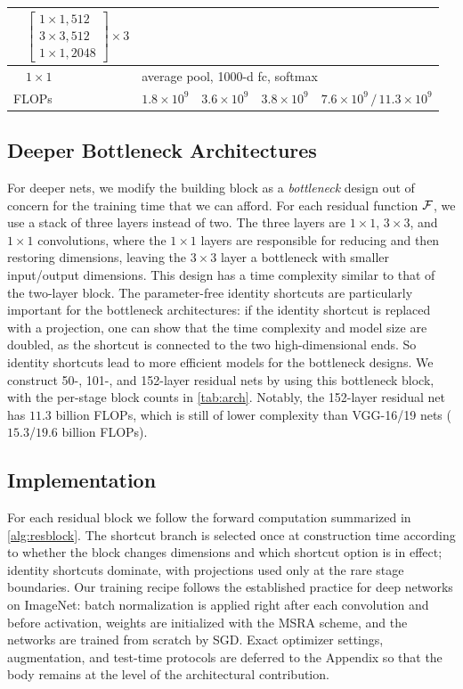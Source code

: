 \begin{table}[t]
\begin{tabular}{l l l l l l}
  & $\left[\begin{smallmatrix}1\times1,512\\3\times3,512\\1\times1,2048\end{smallmatrix}\right]\!\times3$ \\
\midrule
        & $1\times1$ & \multicolumn{4}{l}{average pool, 1000-d fc, softmax} \\
\midrule
\multicolumn{2}{l}{FLOPs}
  & $1.8\times10^{9}$ & $3.6\times10^{9}$ & $3.8\times10^{9}$
  & $7.6\times10^{9}\,/\,11.3\times10^{9}$ \\
\bottomrule
\end{tabular}
\end{table}

\subsection{Deeper Bottleneck Architectures}
\label{sec:bottleneck}
For deeper nets, we modify the building block as a \emph{bottleneck} design out
of concern for the training time that we can afford. For each residual function
$\mathcal{F}$, we use a stack of three layers instead of two. The three layers are
$1\times1$, $3\times3$, and $1\times1$ convolutions, where the $1\times1$ layers
are responsible for reducing and then restoring dimensions, leaving the
$3\times3$ layer a bottleneck with smaller input/output dimensions. This design
has a time complexity similar to that of the two-layer block. The
parameter-free identity shortcuts are particularly important for the bottleneck
architectures: if the identity shortcut is replaced with a projection, one can
show that the time complexity and model size are doubled, as the shortcut is
connected to the two high-dimensional ends. So identity shortcuts lead to more
efficient models for the bottleneck designs. We construct 50-, 101-, and
152-layer residual nets by using this bottleneck block, with the per-stage
block counts in \cref{tab:arch}. Notably, the 152-layer residual net has $11.3$
billion FLOPs, which is still of lower complexity than VGG-16/19 nets ($15.3$/$19.6$
billion FLOPs).

\subsection{Implementation}
\label{sec:impl}
For each residual block we follow the forward computation summarized in
\cref{alg:resblock}. The shortcut branch is selected once at construction time
according to whether the block changes dimensions and which shortcut option is
in effect; identity shortcuts dominate, with projections used only at the rare
stage boundaries. Our training recipe follows the established practice for deep
networks on ImageNet: batch normalization is applied right after each
convolution and before activation, weights are initialized with the MSRA scheme,
and the networks are trained from scratch by SGD. Exact optimizer settings,
augmentation, and test-time protocols are deferred to the Appendix so that the
body remains at the level of the architectural contribution.

